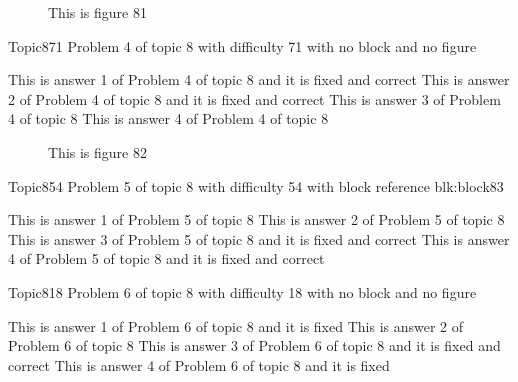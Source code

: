 \documentclass[master]{exam}
\begin{document}
\begin{figure}
	\begin{center}
		This is figure 81 
		\label{fig:figure81}
	\end{center}
\end{figure}

\begin{problem}{Topic8}{71}
	Problem 4 of topic 8 with difficulty 71 with no block and no figure
	\begin{answers}
		 This is answer 1 of Problem 4 of topic 8 and it is fixed and correct
		 This is answer 2 of Problem 4 of topic 8 and it is fixed and correct
		\answer This is answer 3 of Problem 4 of topic 8 
		\answer This is answer 4 of Problem 4 of topic 8 
	\end{answers}
\end{problem}



\begin{figure}
	\begin{center}
		This is figure 82 
		\label{fig:figure82}
	\end{center}
\end{figure}

\begin{problem}[requires=blk:block83]{Topic8}{54}
	Problem 5 of topic 8 with difficulty 54 with block reference blk:block83
	\begin{answers}
		\answer This is answer 1 of Problem 5 of topic 8 
		\answer This is answer 2 of Problem 5 of topic 8 
		 This is answer 3 of Problem 5 of topic 8 and it is fixed and correct
		 This is answer 4 of Problem 5 of topic 8 and it is fixed and correct
	\end{answers}
\end{problem}

\begin{problem}{Topic8}{18}
	Problem 6 of topic 8 with difficulty 18 with no block and no figure
	\begin{answers}
		\answer[fixed] This is answer 1 of Problem 6 of topic 8 and it is fixed
		\answer This is answer 2 of Problem 6 of topic 8 
		 This is answer 3 of Problem 6 of topic 8 and it is fixed and correct
		\answer[fixed] This is answer 4 of Problem 6 of topic 8 and it is fixed
	\end{answers}
\end{problem}
\end{document}
